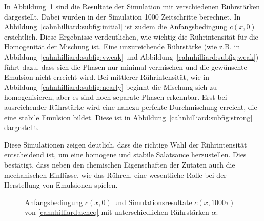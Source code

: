 In Abbildung~\ref{cahnhilliard:fig:achsim}
sind die Resultate der Simulation mit verschiedenen Rührstärken dargestellt.
Dabei wurden in der Simulation 1000 Zeitschritte berechnet.
In Abbildung~\ref{cahnhilliard:subfig:initial}
ist zudem die Anfangsbedingung $c(x,0)$ ersichtlich.
Diese Ergebnisse verdeutlichen,
wie wichtig die Rührintensität für die Homogenität der Mischung ist.
Eine unzureichende Rührstärke
(wie z.B. in Abbildung~\ref{cahnhilliard:subfig:vweak}
und Abbildung~\ref{cahnhilliard:subfig:weak})
führt dazu,
dass sich die Phasen nur minimal vermischen
und die gewünschte Emulsion nicht erreicht wird.
Bei mittlerer Rührintensität,
wie in Abbildung~\ref{cahnhilliard:subfig:nearly}
beginnt die Mischung sich zu homogenisieren,
aber es sind noch separate Phasen erkennbar.
Erst bei ausreichender Rührstärke wird eine nahezu perfekte Durchmischung erreicht,
die eine stabile Emulsion bildet.
Diese ist in Abbildung~\ref{cahnhilliard:subfig:strong} dargestellt.

Diese Simulationen zeigen deutlich,
dass die richtige Wahl der Rührintensität entscheidend ist,
um eine homogene und stabile Salatsauce herzustellen.
Dies bestätigt,
dass neben den chemischen Eigenschaften der Zutaten auch die mechanischen Einflüsse,
wie das Rühren, eine wesentliche Rolle bei der Herstellung von Emulsionen spielen.

\begin{figure}
\centering
{}
%
%
%
%
%
\caption[Simulation der angepassten Cahn-Hilliard-Gleichung]{%
Anfangsbedingung $c(x,0)$ und
Simulationsresultate $c(x,1000\tau)$ von \eqref{cahnhilliard:acheq}
mit unterschiedlichen Rührstärken $\alpha$.}
\label{cahnhilliard:fig:achsim}
\end{figure}
